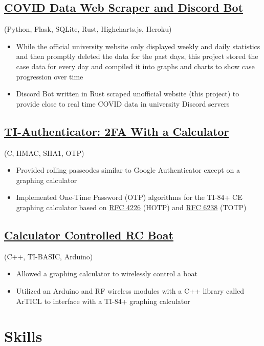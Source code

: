 \documentclass{article}
\begin{document}
\subsection{\href{https://github.com/jshin313/unofficial-temple-covid-live-dashboard}{COVID Data Web Scraper and Discord Bot}} (Python, Flask, SQLite, Rust, Highcharts.js, Heroku)
\begin{itemize}
    \item While the official university website only displayed weekly and daily statistics and then promptly deleted the data for the past days, this project stored the case data for every day and compiled it into graphs and charts to show case progression over time
    \item Discord Bot written in Rust scraped unofficial website (this project) to provide close to real time COVID data in university Discord servers
\end{itemize}

\subsection{\href{https://github.com/jshin313/ti-authenticator}{TI-Authenticator: 2FA With a Calculator}} (C, HMAC, SHA1, OTP)
\begin{itemize}
    \item Provided rolling passcodes similar to Google Authenticator except on a graphing calculator
    \item Implemented One-Time Password (OTP) algorithms for the TI-84+ CE graphing calculator based on \href{https://tools.ietf.org/html/rfc4226}{RFC 4226} (HOTP) and \href{https://tools.ietf.org/html/rfc6238}{RFC 6238} (TOTP)
\end{itemize}

\subsection{\href{https://github.com/jshin313/CalcControlledBoat}{Calculator Controlled RC Boat}} (C++, TI-BASIC, Arduino)
\begin{itemize}
    \item Allowed a graphing calculator to wirelessly control a boat
    \item Utilized an Arduino and RF wireless modules with a C++ library called ArTICL to interface with a TI-84+ graphing calculator
\end{itemize}

\section{Skills}
\end{document}
